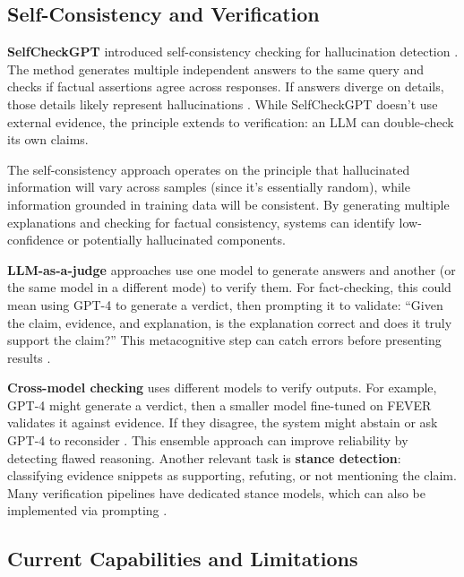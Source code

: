 \documentclass[12pt,a4paper]{article}
\begin{document}
\subsection{Self-Consistency and Verification}

\textbf{SelfCheckGPT} introduced self-consistency checking for hallucination detection \citep{manakul2023selfcheckgpt}. The method generates multiple independent answers to the same query and checks if factual assertions agree across responses. If answers diverge on details, those details likely represent hallucinations \citep{manakul2023selfcheckgpt, wardle2017information}. While SelfCheckGPT doesn't use external evidence, the principle extends to verification: an LLM can double-check its own claims.

The self-consistency approach operates on the principle that hallucinated information will vary across samples (since it's essentially random), while information grounded in training data will be consistent. By generating multiple explanations and checking for factual consistency, systems can identify low-confidence or potentially hallucinated components.

\textbf{LLM-as-a-judge} approaches use one model to generate answers and another (or the same model in a different mode) to verify them. For fact-checking, this could mean using GPT-4 to generate a verdict, then prompting it to validate: ``Given the claim, evidence, and explanation, is the explanation correct and does it truly support the claim?'' This metacognitive step can catch errors before presenting results \citep{raschka2025llmeval, ruder2025llmeval}.

\textbf{Cross-model checking} uses different models to verify outputs. For example, GPT-4 might generate a verdict, then a smaller model fine-tuned on FEVER validates it against evidence. If they disagree, the system might abstain or ask GPT-4 to reconsider \citep{aly2021feverous}. This ensemble approach can improve reliability by detecting flawed reasoning. Another relevant task is \textbf{stance detection}: classifying evidence snippets as supporting, refuting, or not mentioning the claim. Many verification pipelines have dedicated stance models, which can also be implemented via prompting \citep{thorne2018fever}.

\subsection{Current Capabilities and Limitations}
\end{document}
